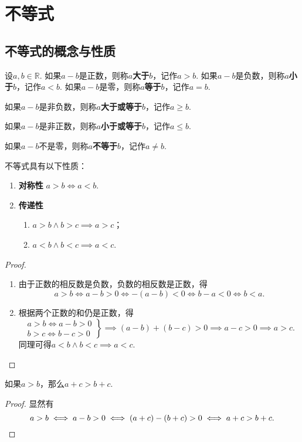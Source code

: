 \chapter{不等式}
\section{不等式的概念与性质}
\begin{definition}
设\(a,b\in\mathbb{R}\).
如果\(a-b\)是正数，则称\(a\)\textbf{大于}\(b\)，记作\(a>b\).
如果\(a-b\)是负数，则称\(a\)\textbf{小于}\(b\)，记作\(a<b\).
如果\(a-b\)是零，则称\(a\)\textbf{等于}\(b\)，记作\(a=b\).

如果\(a-b\)是非负数，则称\(a\)\textbf{大于或等于}\(b\)，记作\(a \geqslant b\).

如果\(a-b\)是非正数，则称\(a\)\textbf{小于或等于}\(b\)，记作\(a \leqslant b\).

如果\(a-b\)不是零，则称\(a\)\textbf{不等于}\(b\)，记作\(a \neq b\).
\end{definition}

\begin{property}
不等式具有以下性质：\begin{enumerate}
\item \textbf{对称性} \(a>b \iff a<b\).
\item \textbf{传递性} \begin{enumerate}
		\item \(a>b \land b>c \implies a>c\)；
		\item \(a<b \land b<c \implies a<c\).
	\end{enumerate}
\end{enumerate}
\begin{proof}
\begin{enumerate}
\item 由于正数的相反数是负数，负数的相反数是正数，得\[
a > b \iff a-b > 0 \iff -(a-b) < 0 \iff b-a < 0 \iff b < a.
\]
\item 根据两个正数的和仍是正数，得\[
\left. \begin{array}{c}
a > b \iff a-b > 0 \\
b > c \iff b-c > 0
\end{array} \right\}
\implies (a-b)+(b-c) > 0
\implies a-c > 0
\implies a > c.
\]同理可得\(a<b \land b<c \implies a<c\).
\qedhere
\end{enumerate}
\end{proof}
\end{property}

\begin{theorem}
如果\(a>b\)，那么\(a+c>b+c\).
\begin{proof}
显然有\[
a>b
\iff a-b>0
\iff (a+c)-(b+c)>0
\iff a+c>b+c.
\qedhere
\]
\end{proof}
\end{theorem}

